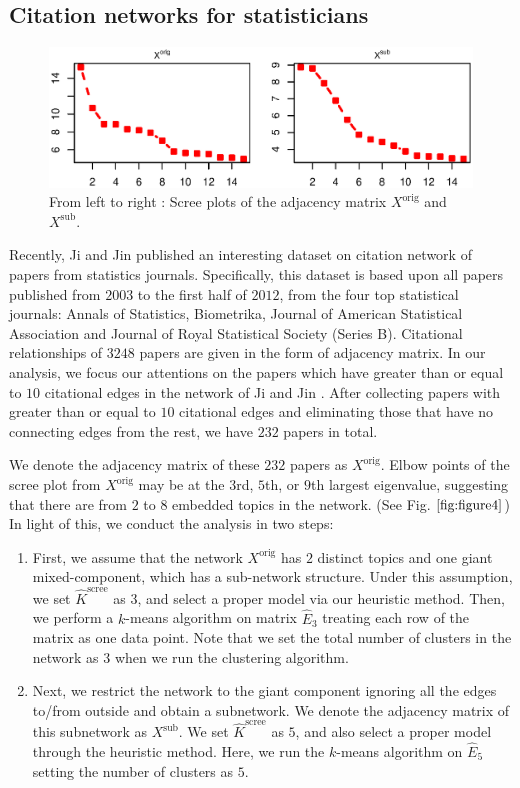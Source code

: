 \documentclass[AMS,STIX1COL]{WileyNJD-v2}
\begin{document}
{\subsection{Citation networks for statisticians}
\label{sec:citation_network}
\begin{figure}[htbp]
\includegraphics[width=1\textwidth]{Fig4.eps}
\caption{From left to right : Scree plots of the adjacency matrix $X^{\mbox{orig}}$ and $X^{\mbox{sub}}$.}
\label{fig:figure4}
\end{figure}
Recently, Ji and Jin \cite{ji2016coauthorship} published an interesting dataset on citation network of papers from statistics journals.
Specifically, this dataset is based upon all papers published from $2003$ to the first half of $2012$, from the four top statistical journals: Annals of Statistics, Biometrika, Journal of American Statistical Association and Journal of Royal Statistical Society (Series B).
Citational relationships of $3248$ papers are given in the form of adjacency matrix.
In our analysis, we focus our attentions on the papers which have greater than or equal to $10$ citational edges in the network of Ji and Jin \cite{ji2016coauthorship}.
After collecting papers with greater than or equal to $10$ citational edges and eliminating those that have no connecting edges from the rest, we have $232$ papers in total.

We denote the adjacency matrix of these $232$ papers as $X^{\mbox{orig}}$.
Elbow points of the scree plot from $X^{\mbox{orig}}$ may be at the $3$rd, $5$th, or $9$th largest eigenvalue, suggesting that there are from $2$ to $8$ embedded topics in the network. (See Fig. $\ref{fig:figure4}$)
In light of this, we conduct the analysis in two steps:
\begin{enumerate}
    \item First, we assume that the network $X^{\mbox{orig}}$ has $2$ distinct topics and one giant mixed-component, which has a sub-network structure. Under this assumption, we set $\widehat{K}^{\mbox{scree}}$ as $3$, and select a proper model via our heuristic method.
        Then, we perform a $k$-means algorithm on matrix $\widehat{E}_{3}$ treating each row of the matrix as one data point.
        Note that we set the total number of clusters in the network as $3$ when we run the clustering algorithm.
    \item Next, we restrict the network to the giant component ignoring all the edges to/from outside and obtain a subnetwork.
        We denote the adjacency matrix of this subnetwork as $X^{\mbox{sub}}$. We set $\widehat{K}^{\mbox{scree}}$ as $5$, and also select a proper model through the heuristic method.
        Here, we run the $k$-means algorithm on $\widehat{E}_{5}$ setting the number of clusters as $5$.
\end{enumerate}

}
\end{document}
